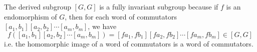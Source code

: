 \documentclass[12pt]{article}
\begin{document}
The derived subgroup $[G,G]$ is a fully invariant subgroup because if $f$ is an endomorphism of $G$, then for each word of commutators $[a_1,b_1][a_2,b_2]\cdots[a_m,b_m]$, we have 
$$f([a_1,b_1][a_2,b_2]\cdots[a_m,b_m])=[fa_1,fb_1][fa_2,fb_2]\cdots[fa_m,fb_m]\in [G,G]$$
i.e. the homomorphic image of a word of commutators is a word of commutators.
  
\end{document}
